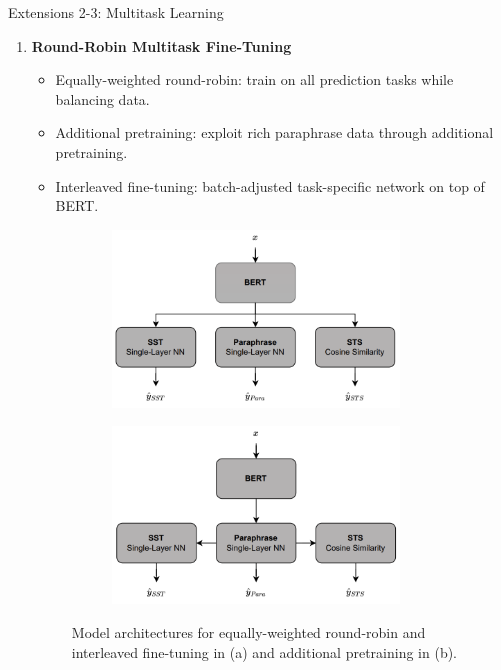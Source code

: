 \documentclass[final]{beamer}
\newlength{\colwidth}
\begin{document}
\begin{frame}[t]
\begin{columns}[t]
\begin{column}{\colwidth}
\begin{block}{Extensions 2-3: Multitask Learning}
    \begin{enumerate}%
      \item \textbf{Round-Robin Multitask Fine-Tuning}
      \begin{itemize}
      \normalsize
          \item Equally-weighted round-robin: train on all prediction tasks while balancing data.
          \item Additional pretraining: exploit rich paraphrase data through additional pretraining.
          \item Interleaved fine-tuning: batch-adjusted task-specific network on top of BERT.
          \vspace{-0.3cm}
      \end{itemize}
          \begin{figure}[H]
     \centering
     \begin{subfigure}[b]{0.485\textwidth}
         \centering
        \includegraphics[width=0.9\textwidth]{writeup/round-robin.png}
         \caption{}
     \end{subfigure}
     \begin{subfigure}[b]{0.485\textwidth}
        \centering
        \includegraphics[width=0.9\textwidth]{writeup/add-pretrain.png}
         \caption{}
     \end{subfigure}
\caption{Model architectures for equally-weighted round-robin and interleaved fine-tuning in (a) and additional pretraining in (b).} %
\label{fig:birds}
\end{figure} 
      

\end{enumerate}
\end{block}
\end{column}
\end{columns}
\end{frame}
\end{document}
